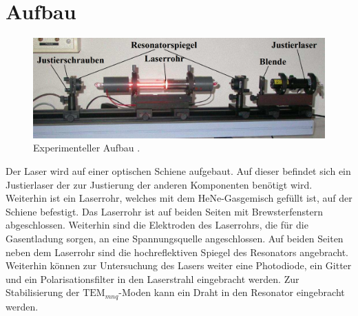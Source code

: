 \section{Aufbau}
\label{sec:Aufbau}
\begin{figure}
	\centering
	\includegraphics[width=\linewidth-100pt,height=\textheight-100pt,keepaspectratio]{content/Images/aufbau.png}
	\caption{Experimenteller Aufbau \cite{V61}.}
	\label{fig:Aufbau}
\end{figure}

Der Laser wird auf einer optischen Schiene aufgebaut. Auf dieser befindet sich ein Justierlaser der zur Justierung der anderen Komponenten benötigt wird. Weiterhin ist ein Laserrohr, welches mit dem HeNe-Gasgemisch gefüllt ist, auf der Schiene befestigt. Das Laserrohr ist auf beiden Seiten mit Brewsterfenstern abgeschlossen. Weiterhin sind die Elektroden des Laserrohrs, die für die Gasentladung sorgen, an eine Spannungsquelle angeschlossen. Auf beiden Seiten neben dem Laserrohr sind die hochreflektiven Spiegel des Resonators angebracht. Weiterhin können zur Untersuchung des Lasers weiter eine Photodiode, ein Gitter und ein Polarisationsfilter in den Laserstrahl eingebracht werden. Zur Stabilisierung der  $\text{TEM}_{mnq}$-Moden kann ein Draht in den Resonator eingebracht werden.